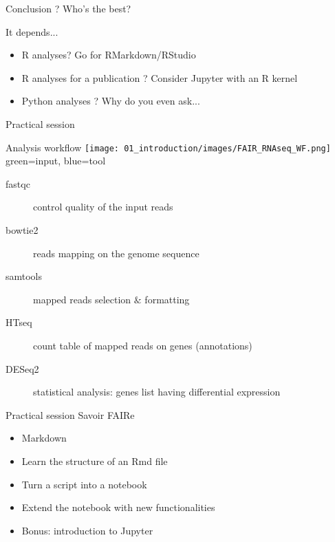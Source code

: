 \begin{frame}{Conclusion ?}
Who's the best? \newline \pause 

It depends... \pause

\begin{itemize}
    \item<2-> R analyses? Go for RMarkdown/RStudio
    \item<3-> R analyses for a publication ? Consider Jupyter with an R kernel
    \item<4-> Python analyses ? Why do you even ask... 
\end{itemize}

\end{frame}

\begin{frame}{Practical session}
\begin{block}{Analysis workflow}
    \texttt{[image: 01\_introduction/images/FAIR\_RNAseq\_WF.png]}\\
green=input, blue=tool
\end{block}
\footnotesize{
\begin{description}
    \item[fastqc] control quality of the input reads
    \item[bowtie2] reads mapping on the genome sequence
    \item[samtools] mapped reads selection $\&$ formatting
    \item[HTseq] count table of mapped reads on genes (annotations)
    \item[DESeq2] statistical analysis: genes list having differential expression
\end{description}
}
\end{frame}

\begin{frame}{Practical session}
Savoir FAIRe

\begin{itemize}
  \item Markdown
  \item Learn the structure of an Rmd file
  \item Turn a script into a notebook
  \item Extend the notebook with new functionalities
  \item Bonus: introduction to Jupyter
\end{itemize}
\end{frame}

